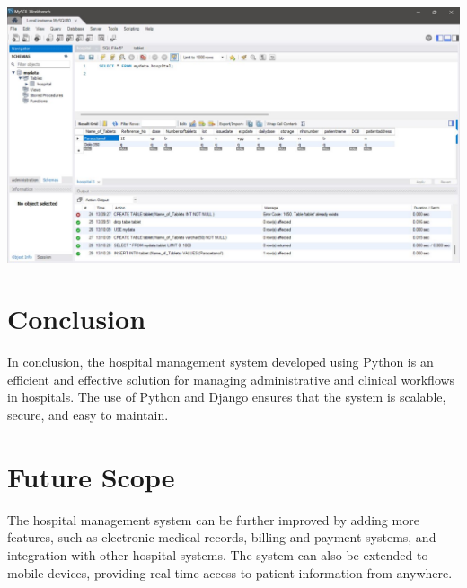 \documentclass{article}
\begin{document}
\begin{center}
	\includegraphics*[scale = 0.4]{C3.jpg}
\end{center}

\section{\textbf{Conclusion}}
In conclusion, the hospital management system developed using Python is an efficient and effective solution for managing administrative and clinical workflows in hospitals. The use of Python and Django ensures that the system is scalable, secure, and easy to maintain.

\section{\textbf{Future Scope}}
The hospital management system can be further improved by adding more features, such as electronic medical records, billing and payment systems, and integration with other hospital systems. The system can also be extended to mobile devices, providing real-time access to patient information from anywhere.
\end{document}
